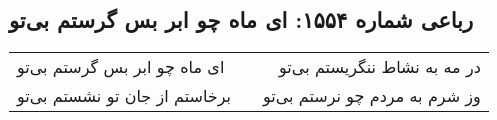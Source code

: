 \begin{center}
\section*{رباعی شماره ۱۵۵۴: ای ماه چو ابر بس گرستم بی‌تو}
\label{sec:1554}
\begin{longtable}{l p{0.5cm} r}
ای ماه چو ابر بس گرستم بی‌تو
&&
در مه به نشاط ننگریستم بی‌تو
\\
برخاستم از جان تو نشستم بی‌تو
&&
وز شرم به مردم چو نرستم بی‌تو
\\
\end{longtable}
\end{center}
